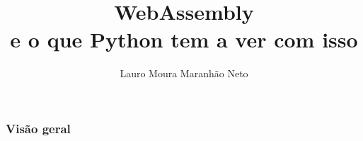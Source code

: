 \documentclass[12pt,mathserif]{beamer}
\author{Lauro Moura Maranhão Neto}
\title{WebAssembly \\ e o que Python tem a ver com isso} %
\institute{Expertise Solutions}
\begin{document}
\begin{frame}
  \titlepage
\end{frame}


\begin{frame}
\frametitle{Visão geral}
\tableofcontents
\end{frame}


\end{document}
